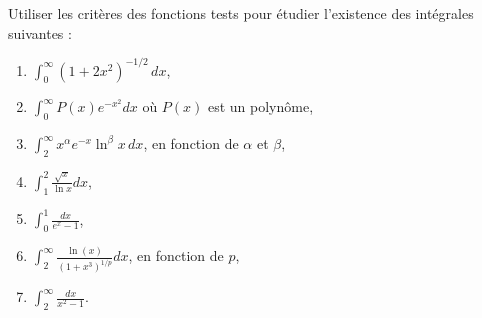 \begin{exercice}\label{exo_I-2-1}

Utiliser les critères des fonctions tests pour étudier l'existence des intégrales suivantes :
 
\begin{enumerate}
	\item \label{ExoPointPremierIdeuxUn} $\int_0^{\infty}(1+2x^2)^{-1/2}\,dx$,
	\item $\int_0^{\infty}P(x)e^{-x^2}dx$ où $P(x)$ est un polynôme,
	\item $\int_2^{\infty} x^{\alpha} e^{-x}\ln^{\beta}x\,dx$, en fonction de $\alpha$ et $\beta$,
	\item\label{ItemDExoI21} $\int_1^2\frac{ \sqrt{x} }{ \ln x }dx$,
	\item $\int_0^1\frac{ dx }{  e^{x}-1 }$,
	\item $\int_2^{\infty}\frac{ \ln(x) }{ (1+x^3)^{1/p} }dx$, en fonction de $p$,
	\item $\int_2^{\infty}\frac{ dx }{ x^2-1 }$.
\end{enumerate}


\end{exercice}


